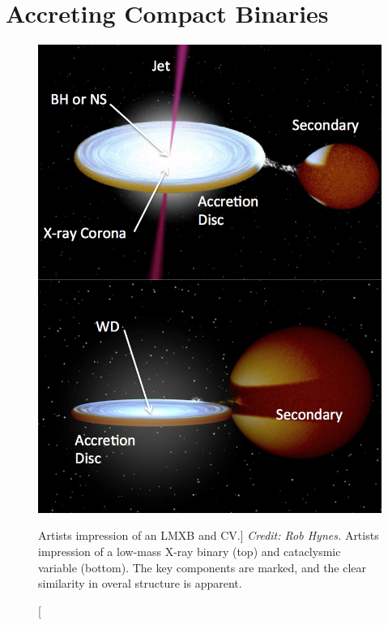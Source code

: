 \section{Accreting Compact Binaries}

\begin{figure}
\centering
\includegraphics[width=1.0\textwidth]{figures/01-intro/cv_and_xrb.png}
\caption
[Artists impression of an LMXB and CV.]
{
{\sl Credit: Rob Hynes.} 
Artists impression of a low-mass X-ray binary (top) and
cataclysmic variable (bottom). The key components are marked,
and the clear similarity in overal structure is apparent.
} 
\label{fig:cv_and_xrb}
\end{figure}

